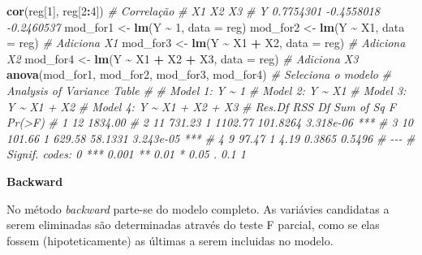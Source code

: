 \documentclass[
]{book}
\newenvironment{Shaded}{\begin{snugshade}}{\end{snugshade}}
\newcommand{\CommentTok}[1]{\textcolor[rgb]{0.56,0.35,0.01}{\textit{#1}}}
\newcommand{\DataTypeTok}[1]{\textcolor[rgb]{0.13,0.29,0.53}{#1}}
\newcommand{\DecValTok}[1]{\textcolor[rgb]{0.00,0.00,0.81}{#1}}
\newcommand{\KeywordTok}[1]{\textcolor[rgb]{0.13,0.29,0.53}{\textbf{#1}}}
\newcommand{\NormalTok}[1]{#1}
\newcommand{\OperatorTok}[1]{\textcolor[rgb]{0.81,0.36,0.00}{\textbf{#1}}}
\newcommand{\StringTok}[1]{\textcolor[rgb]{0.31,0.60,0.02}{#1}}
\numberwithin{equation}{section}
\newcommand{\indt}[1]{\index{#1|ST}}
\begin{document}
\begin{Shaded}
\begin{Highlighting}[]
\KeywordTok{cor}\NormalTok{(reg[}\DecValTok{1}\NormalTok{], reg[}\DecValTok{2}\OperatorTok{:}\DecValTok{4}\NormalTok{]) }\CommentTok{\# Correlação}
\CommentTok{\#          X1         X2         X3}
\CommentTok{\# Y 0.7754301 {-}0.4558018 {-}0.2460537}
\NormalTok{mod\_for1 \textless{}{-}}\StringTok{ }\KeywordTok{lm}\NormalTok{(Y }\OperatorTok{\textasciitilde{}}\StringTok{ }\DecValTok{1}\NormalTok{, }\DataTypeTok{data =}\NormalTok{ reg)}
\NormalTok{mod\_for2 \textless{}{-}}\StringTok{ }\KeywordTok{lm}\NormalTok{(Y }\OperatorTok{\textasciitilde{}}\StringTok{ }\NormalTok{X1, }\DataTypeTok{data =}\NormalTok{ reg) }\CommentTok{\# Adiciona X1 }
\NormalTok{mod\_for3 \textless{}{-}}\StringTok{ }\KeywordTok{lm}\NormalTok{(Y }\OperatorTok{\textasciitilde{}}\StringTok{ }\NormalTok{X1 }\OperatorTok{+}\StringTok{ }\NormalTok{X2, }\DataTypeTok{data =}\NormalTok{ reg)  }\CommentTok{\# Adiciona X2 }
\NormalTok{mod\_for4 \textless{}{-}}\StringTok{ }\KeywordTok{lm}\NormalTok{(Y }\OperatorTok{\textasciitilde{}}\StringTok{ }\NormalTok{X1 }\OperatorTok{+}\StringTok{ }\NormalTok{X2 }\OperatorTok{+}\StringTok{ }\NormalTok{X3, }\DataTypeTok{data =}\NormalTok{ reg)  }\CommentTok{\# Adiciona X3 }
\KeywordTok{anova}\NormalTok{(mod\_for1, mod\_for2, mod\_for3, mod\_for4)  }\CommentTok{\# Seleciona o modelo }
\CommentTok{\# Analysis of Variance Table}
\CommentTok{\# }
\CommentTok{\# Model 1: Y \textasciitilde{} 1}
\CommentTok{\# Model 2: Y \textasciitilde{} X1}
\CommentTok{\# Model 3: Y \textasciitilde{} X1 + X2}
\CommentTok{\# Model 4: Y \textasciitilde{} X1 + X2 + X3}
\CommentTok{\#   Res.Df     RSS Df Sum of Sq        F    Pr(\textgreater{}F)    }
\CommentTok{\# 1     12 1834.00                                    }
\CommentTok{\# 2     11  731.23  1   1102.77 101.8264 3.318e{-}06 ***}
\CommentTok{\# 3     10  101.66  1    629.58  58.1331 3.243e{-}05 ***}
\CommentTok{\# 4      9   97.47  1      4.19   0.3865    0.5496    }
\CommentTok{\# {-}{-}{-}}
\CommentTok{\# Signif. codes:  0 \textquotesingle{}***\textquotesingle{} 0.001 \textquotesingle{}**\textquotesingle{} 0.01 \textquotesingle{}*\textquotesingle{} 0.05 \textquotesingle{}.\textquotesingle{} 0.1 \textquotesingle{} \textquotesingle{} 1}
\end{Highlighting}
\end{Shaded}

\textbf{Backward} \indt{backward}

No método \emph{backward} parte-se do modelo completo. As variávies candidatas a serem eliminadas são determinadas através do teste F parcial, como se elas fossem (hipoteticamente) as últimas a serem incluidas no modelo.
\end{document}
